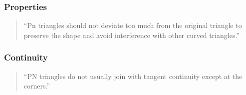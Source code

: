 

\begin{frame}\frametitle{Properties}
	\begin{quote}
		``Pn triangles should not deviate too much from the original triangle to preserve the shape and avoid interference with other curved triangles.''
		\citeauthor{vlachos2001curved}
	\end{quote}
\end{frame}

\begin{frame}\frametitle{Continuity}
    \begin{quote}
		``PN triangles do not usually join with tangent continuity except at the corners.''
		\citeauthor{vlachos2001curved}
	\end{quote}
\end{frame}



